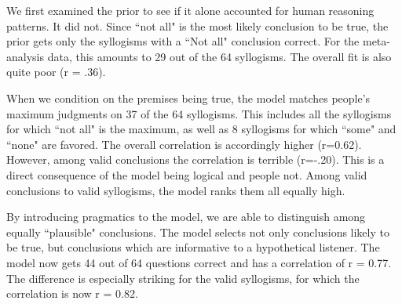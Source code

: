 \documentclass[10pt,letterpaper]{article}
\begin{document}
We first examined the prior to see if it alone accounted for human reasoning patterns. It did not. Since ``not all" is the most likely conclusion to be true, the prior gets only the syllogisms with a ``Not all" conclusion correct. For the meta-analysis data, this amounts to 29 out of the 64 syllogisms. The overall fit is also quite poor (r = .36). 

When we condition on the premises being true, the model matches people's maximum judgments on 37 of the 64 syllogisms. This includes all the syllogisms for which ``not all" is the maximum, as well as 8 syllogisms for which ``some" and ``none" are favored. The overall correlation is accordingly higher (r=0.62). However, among valid conclusions the correlation is terrible (r=-.20). This is a direct consequence of the model being logical and people not. Among valid conclusions to valid syllogisms, the model ranks them all equally high. 

By introducing pragmatics to the model, we are able to distinguish among equally ``plausible" conclusions. The model selects not only conclusions likely to be true, but conclusions which are informative to a hypothetical listener. The model now gets 44 out of 64 questions correct and has a correlation of r = 0.77. The difference is especially striking for the valid syllogisms, for which the correlation is now r = 0.82. 


%
\end{document}
